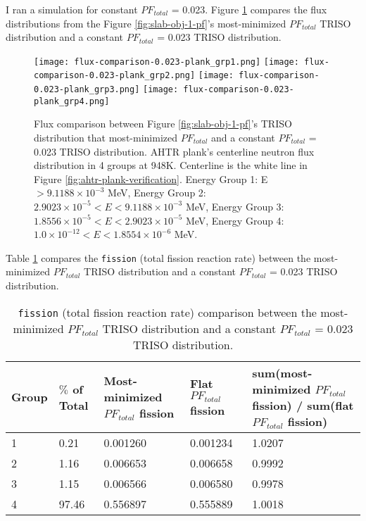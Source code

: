 I ran a simulation for constant $PF_{total}$ = 0.023. 
Figure \ref{fig:flux-comparison-0.023-plank} compares the flux distributions from the 
Figure \ref{fig:slab-obj-1-pf}'s most-minimized $PF_{total}$ TRISO distribution and a 
constant $PF_{total}$ = 0.023 TRISO distribution. 
\begin{figure}[H]
    \centering
    \texttt{[image: flux-comparison-0.023-plank\_grp1.png]} 
    \texttt{[image: flux-comparison-0.023-plank\_grp2.png]} 
    \texttt{[image: flux-comparison-0.023-plank\_grp3.png]} 
    \texttt{[image: flux-comparison-0.023-plank\_grp4.png]} 
    \caption{Flux comparison between Figure \ref{fig:slab-obj-1-pf}'s TRISO 
    distribution that most-minimized $PF_{total}$ and a constant $PF_{total}$ = 0.023
    TRISO distribution. 
    \acrfull{AHTR} plank's centerline neutron flux distribution in 4 groups at 948K. 
    Centerline is the white line in Figure \ref{fig:ahtr-plank-verification}.
    Energy Group 1: E $> 9.1188 \times 10^{-3}$ MeV, 
    Energy Group 2: $2.9023 \times 10^{-5} < E < 9.1188 \times 10^{-3}$ MeV,
    Energy Group 3:  $1.8556 \times 10^{-5} < E < 2.9023 \times 10^{-5}$ MeV,
    Energy Group 4:  $1.0 \times 10^{-12} < E < 1.8554 \times 10^{-6}$ MeV.}
    \label{fig:flux-comparison-0.023-plank}
\end{figure}

Table \ref{tab:0.023-plank-fission-rate} compares the \texttt{fission} 
(total fission reaction rate) between the most-minimized $PF_{total}$ TRISO 
distribution and a constant $PF_{total}$ = 0.023 TRISO distribution.
\begin{table}[H]
    \centering
    \onehalfspacing
    \caption{\texttt{fission} (total fission reaction rate) comparison 
    between the most-minimized $PF_{total}$ TRISO distribution and a constant 
    $PF_{total}$ = 0.023 TRISO distribution.}
	\label{tab:0.023-plank-fission-rate}
    \footnotesize
    \begin{tabular}{llp{4cm}p{2.7cm}p{6cm}}
    \hline
    \textbf{Group} & 
    \textbf{$\%$ of Total} &
    \textbf{Most-minimized $PF_{total}$ fission} & 
    \textbf{Flat $PF_{total}$ fission} & 
    \textbf{sum(most-minimized $PF_{total}$ fission) / sum(flat $PF_{total}$ fission)}\\
    \hline 
    1 & 0.21 & 0.001260 & 0.001234 & 1.0207 \\
    2 & 1.16 & 0.006653 & 0.006658 & 0.9992 \\
    3 & 1.15 & 0.006566 & 0.006580 & 0.9978 \\
    4 & 97.46 & 0.556897 & 0.555889 & 1.0018 \\
    \hline
    \end{tabular}
\end{table}

